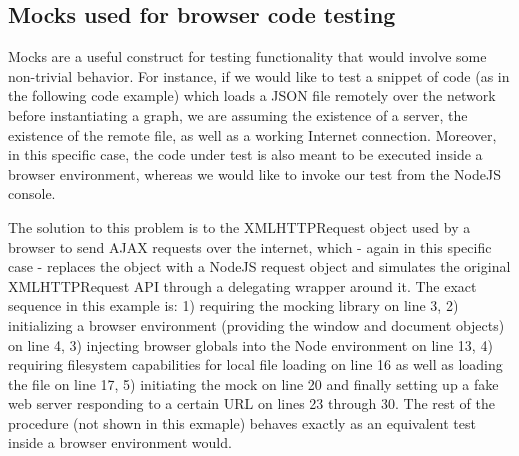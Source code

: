 	
	\subsection{Mocks used for browser code testing}
	\label{ssect:mocks}
	
	Mocks are a useful construct for testing functionality that would involve some non-trivial behavior. For instance, if we would like to test a snippet of code (as in the following code example) which loads a JSON file remotely over the network before instantiating a graph, we are assuming the existence of a server, the existence of the remote file, as well as a working Internet connection. Moreover, in this specific case, the code under test is also meant to be executed inside a browser environment, whereas we would like to invoke our test from the NodeJS console.
	
	The solution to this problem is to  the XMLHTTPRequest object used by a browser to send AJAX requests over the internet, which - again in this specific case - replaces the object with a NodeJS request object and simulates the original XMLHTTPRequest API through a delegating wrapper around it. The exact sequence in this example is: 1) requiring the mocking library on line 3, 2) initializing a browser environment (providing the window and document objects) on line 4, 3) injecting browser globals into the Node environment on line 13, 4) requiring filesystem capabilities for local file loading on line 16 as well as loading the file on line 17, 5) initiating the mock on line 20 and finally setting up a fake web server responding to a certain URL on lines 23 through 30. The rest of the procedure (not shown in this exmaple) behaves exactly as an equivalent test inside a browser environment would.
	
